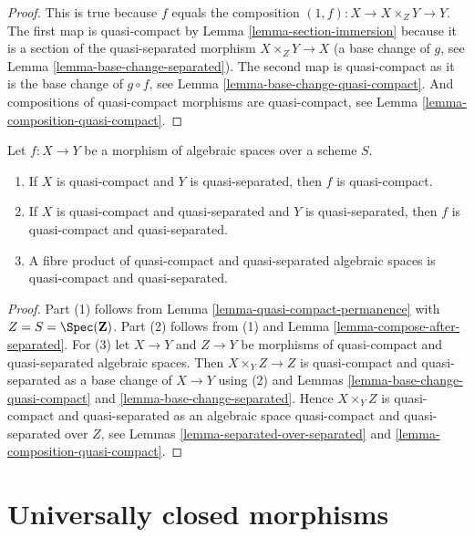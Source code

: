 \begin{proof}
This is true because $f$ equals the composition
$(1, f) : X \to X \times_Z Y \to Y$. The first map
is quasi-compact by Lemma \ref{lemma-section-immersion}
because it is a section of the quasi-separated morphism $X \times_Z Y \to X$
(a base change of $g$, see Lemma \ref{lemma-base-change-separated}).
The second map is quasi-compact as it
is the base change of $g \circ f$, see
Lemma \ref{lemma-base-change-quasi-compact}.
And compositions of quasi-compact
morphisms are quasi-compact, see Lemma \ref{lemma-composition-quasi-compact}.
\end{proof}

\begin{lemma}
\label{lemma-quasi-compact-quasi-separated-permanence}
Let $f : X \to Y$ be a morphism of algebraic spaces
over a scheme $S$.
\begin{enumerate}
\item If $X$ is quasi-compact and $Y$ is quasi-separated, then $f$ is
quasi-compact.
\item If $X$ is quasi-compact and quasi-separated and $Y$ is quasi-separated,
then $f$ is quasi-compact and quasi-separated.
\item A fibre product of quasi-compact and quasi-separated algebraic spaces
is quasi-compact and quasi-separated.
\end{enumerate}
\end{lemma}

\begin{proof}
Part (1) follows from
Lemma \ref{lemma-quasi-compact-permanence}
with $Z = S = \Spec(\mathbf{Z})$.
Part (2) follows from (1) and
Lemma \ref{lemma-compose-after-separated}.
For (3) let $X \to Y$ and $Z \to Y$ be morphisms
of quasi-compact and quasi-separated algebraic spaces. Then
$X \times_Y Z \to Z$ is quasi-compact and quasi-separated as a
base change of $X \to Y$ using (2) and
Lemmas \ref{lemma-base-change-quasi-compact} and
\ref{lemma-base-change-separated}.
Hence $X \times_Y Z$ is quasi-compact and quasi-separated as
an algebraic space quasi-compact and quasi-separated over
$Z$, see
Lemmas \ref{lemma-separated-over-separated} and
\ref{lemma-composition-quasi-compact}.
\end{proof}


\section{Universally closed morphisms}
\label{section-universally-closed}

